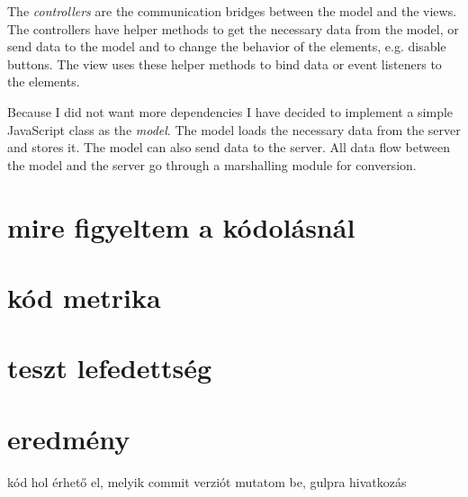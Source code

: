 The \emph{controllers} are the communication bridges between the model and the views. The controllers have helper methods to get the necessary data from the model, or send data to the model and to change the behavior of the elements, e.g. disable buttons. The view uses these helper methods to bind data or event listeners to the elements.

Because I did not want more dependencies I have decided to implement a simple JavaScript class as the \emph{model}. The model loads the necessary data from the server and stores it. The model can also send data to the server. All data flow between the model and the server go through a marshalling module for conversion.


\section{mire figyeltem a kódolásnál}
\section{kód metrika}
\section{teszt lefedettség}
\section{eredmény}
kód hol érhető el, melyik commit verziót mutatom be, gulpra hivatkozás
